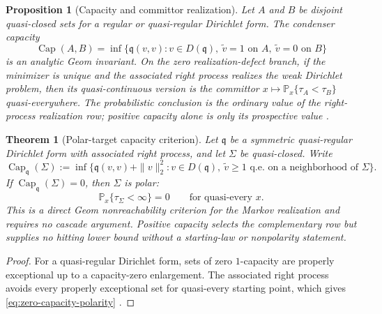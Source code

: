 \documentclass[11pt]{article}
\numberwithin{section}{part}
\theoremstyle{plain}
\newtheorem{theorem}{Theorem}[section]
\newtheorem{proposition}[proposition]{Proposition}
\theoremstyle{definition}
\theoremstyle{remark}
\newcommand{\Capacity}{\operatorname{Cap}}
\begin{document}
\begin{proposition}[Capacity and committor realization]
\label{prop:capacity-committor-realization}
Let \(A\) and \(B\) be disjoint quasi-closed sets for a regular or
quasi-regular Dirichlet form.  The condenser capacity
\[
 \Capacity(A,B)
 =\inf\{\mathfrak q(v,v):v\in D(\mathfrak q),\ \widetilde v=1
 \text{ on }A,\ \widetilde v=0\text{ on }B\}
\]
is an analytic Geom invariant.  On the zero realization-defect branch, if the minimizer is unique and the
associated right process realizes the weak Dirichlet problem, then its
quasi-continuous version is the committor
\(x\mapsto\mathbb P_x\{\tau_A<\tau_B\}\) quasi-everywhere.  The probabilistic
conclusion is the ordinary value of the right-process realization row;
positive capacity alone is only its prospective value
\citep{FukushimaOshimaTakeda2011,MaRoeckner1992}.
\end{proposition}

\begin{theorem}[Polar-target capacity criterion]
\label{thm:zero-capacity-polarity}
Let \(\mathfrak q\) be a symmetric quasi-regular Dirichlet form with
associated right process, and let \(\Sigma\) be quasi-closed.  Write
\[
 \Capacity_{\mathfrak q}(\Sigma)
 :=\inf\{\mathfrak q(v,v)+\|v\|_2^2:
      v\in D(\mathfrak q),\ \widetilde v\ge1
      \text{ q.e. on a neighborhood of }\Sigma\}.
\]
If \(\Capacity_{\mathfrak q}(\Sigma)=0\), then \(\Sigma\) is polar:
\begin{equation}
 \label{eq:zero-capacity-polarity}
 \mathbb P_x\{\tau_\Sigma<\infty\}=0
 \qquad\text{for quasi-every }x.
\end{equation}
This is a direct Geom nonreachability criterion for the Markov realization
and requires no cascade argument.  Positive capacity selects the complementary row
but supplies no hitting lower bound without a starting-law or nonpolarity
statement.
\end{theorem}

\begin{proof}
For a quasi-regular Dirichlet form, sets of zero \(1\)-capacity are properly
exceptional up to a capacity-zero enlargement.  The associated right process
avoids every properly exceptional set for quasi-every starting point, which
gives \eqref{eq:zero-capacity-polarity}
\citep{FukushimaOshimaTakeda2011,MaRoeckner1992}.
\end{proof}
\end{document}
